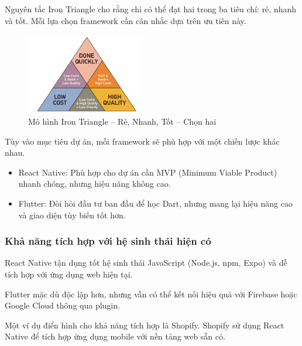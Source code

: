       Nguyên tắc Iron Triangle cho rằng chỉ có thể đạt hai trong ba tiêu chí: rẻ, nhanh và tốt. Mỗi lựa chọn framework cần cân nhắc dựa trên ưu tiên này.
    \vspace{0.5em}

    \begin{figure}[H]
    \centering
    \includegraphics[width=0.45\textwidth]{images/iron_triangle.png}
    \caption{Mô hình Iron Triangle – Rẻ, Nhanh, Tốt – Chọn hai \cite{goodipidea2016}}
    \label{fig:android_ios_tools2}
  \end{figure}
    
      Tùy vào mục tiêu dự án, mỗi framework sẽ phù hợp với một chiến lược khác nhau.
      \setlength{\leftmargini}{1.5cm}
      \begin{itemize}
          \item React Native: Phù hợp cho dự án cần MVP (Minimum Viable Product) nhanh chóng, nhưng hiệu năng không cao.
          \item Flutter: Đòi hỏi đầu tư ban đầu để học Dart, nhưng mang lại hiệu năng cao và giao diện tùy biến tốt hơn.
      \end{itemize}
    

  \subsubsection{Khả năng tích hợp với hệ sinh thái hiện có}
      React Native tận dụng tốt hệ sinh thái JavaScript (Node.js, npm, Expo) và dễ tích hợp với ứng dụng web hiện tại.

      \vspace{0.5em}

      Flutter mặc dù độc lập hơn, nhưng vẫn có thể kết nối hiệu quả với Firebase hoặc Google Cloud thông qua plugin.

      \vspace{0.5em}
  
      Một ví dụ điển hình cho khả năng tích hợp là Shopify. Shopify sử dụng React Native để tích hợp ứng dụng mobile với nền tảng web sẵn có.

